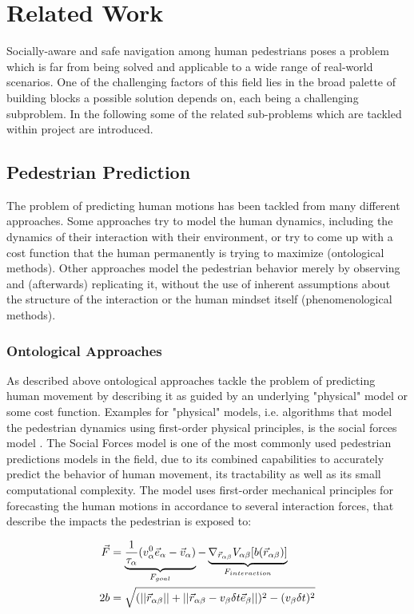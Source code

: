 \chapter{Related Work}
\label{text:related}
Socially-aware and safe navigation among human pedestrians poses a problem which is far from being solved and applicable to a wide range of real-world scenarios. One of the challenging factors of this field lies in the broad palette of building blocks a possible solution depends on, each being a challenging subproblem. In the following some of the related sub-problems which are tackled within project \project are introduced.

\section{Pedestrian Prediction}
\label{text:related/prediction}
The problem of predicting human motions has been tackled from many different approaches. Some approaches try to model the human dynamics, including the dynamics of their interaction with their environment, or try to come up with a  cost function that the human permanently is trying to maximize (ontological methods). Other approaches model the pedestrian behavior merely by observing and (afterwards) replicating it, without the use of inherent assumptions about the structure of the interaction or the human mindset itself (phenomenological methods).

\subsection{Ontological Approaches}
As described above ontological approaches tackle the problem of predicting human movement by describing it as guided by an underlying "physical" model or some cost function. Examples for "physical" models, i.e. algorithms that model the pedestrian dynamics using first-order physical principles, is the social forces model \cite{Helbing1995}. The Social Forces model is one of the most commonly used pedestrian predictions models in the field, due to its combined capabilities to accurately predict the behavior of human movement, its tractability as well as its small computational complexity. The model uses first-order mechanical principles for forecasting the human motions in accordance to several interaction forces, that describe the impacts the pedestrian is exposed to:

\begin{align}
\vec{F} &= \underbrace{\frac{1}{\tau_{\alpha}} (v^0_{\alpha} \vec{e}_{\alpha} - \vec{v}_{\alpha})}_{F_{goal}} - \underbrace{\nabla_{\vec{r}_{\alpha \beta}} V_{\alpha \beta}[b(\vec{r}_{\alpha \beta})]}_{F_{interaction}} 
\label{eq:social_forces} \\
2b &= \sqrt{(||\vec{r}_{\alpha \beta}|| + ||\vec{r}_{\alpha \beta} - v_{\beta} \delta t \vec{e}_{\beta}||)^2 - (v_{\beta} \delta t)^2}
\end{align}


